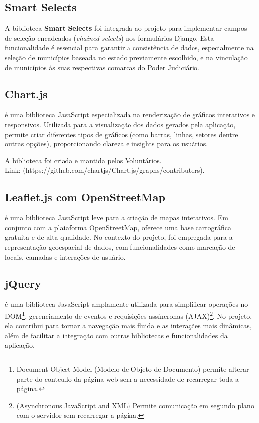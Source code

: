\subsection{Smart Selects}
\par A biblioteca \textbf{Smart Selects} \cite{smart_selects:2025} foi integrada ao projeto para implementar campos de seleção encadeados (\textit{chained selects}) nos formulários Django. Esta funcionalidade é essencial para garantir a consistência de dados, especialmente na seleção de municípios baseada no estado previamente escolhido, e na vinculação de municípios às suas respectivas comarcas do Poder Judiciário.

\subsection{Chart.js}
\par {} é uma biblioteca JavaScript especializada na renderização de gráficos interativos e responsivos. Utilizada para a visualização dos dados gerados pela aplicação, permite criar diferentes tipos de gráficos (como barras, linhas, setores dentre outras opções), proporcionando clareza e insights para os usuários.
\par A biblioteca foi criada e mantida pelos \href{https://github.com/chartjs/Chart.js/graphs/contributors}{Voluntários}. \\
Link: (https://github.com/chartjs/Chart.js/graphs/contributors).

\subsection{Leaflet.js com OpenStreetMap}
\par {} é uma biblioteca JavaScript leve para a criação de mapas interativos. Em conjunto com a plataforma \href{https://www.openstreetmap.org/#map=7/-26.613/-50.746}{OpenStreetMap}, oferece uma base cartográfica gratuita e de alta qualidade. No contexto do projeto, foi empregada para a representação geoespacial de dados, com funcionalidades como marcação de locais, camadas e interações de usuário.

\subsection{jQuery}\label{jQuery}
\par {} é uma biblioteca JavaScript amplamente utilizada para simplificar operações no DOM\footnote{Document Object Model (Modelo de Objeto de Documento) permite alterar parte do conteudo da página web sem a necessidade de recarregar toda a página.}, gerenciamento de eventos e requisições assíncronas (AJAX)\footnote{(Asynchronous JavaScript and XML) Permite comunicação em segundo plano com o servidor sem recarregar a página.}. No projeto, ela contribui para tornar a navegação mais fluida e as interações mais dinâmicas, além de facilitar a integração com outras bibliotecas e funcionalidades da aplicação.


